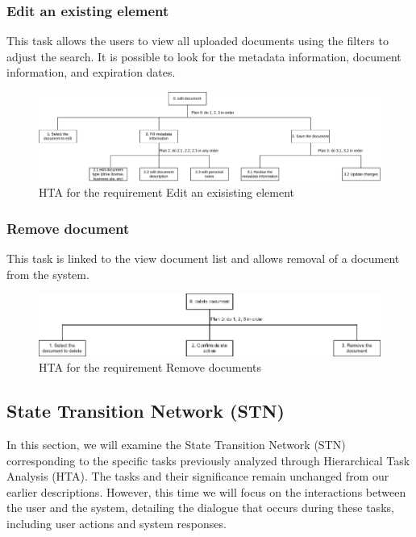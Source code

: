 \subsubsection{Edit an existing element}
This task allows the users to view all uploaded documents using the filters to adjust the search. It is possible to look for the metadata information, document information, and expiration dates.
\begin{figure}[H]
	\centering
	\includegraphics[width=\textwidth]{../Draw.io diagrams/edit_document.drawio.png}  %
	\caption{HTA for the requirement Edit an exisisting element}
\end{figure}
\subsubsection{Remove document}
This task is linked to the view document list and allows removal of a document from the system.
\begin{figure}[H]
	\centering
	\includegraphics[width=\textwidth]{../Draw.io diagrams/delete_document.drawio.png}  %
	\caption{HTA for the requirement Remove documents}
\end{figure}
\subsection{State Transition Network (STN)}
In this section, we will examine the State Transition Network (STN) corresponding to the specific tasks previously analyzed through Hierarchical Task Analysis (HTA). The tasks and their significance remain unchanged from our earlier descriptions. However, this time we will focus on the interactions between the user and the system, detailing the dialogue that occurs during these tasks, including user actions and system responses.
